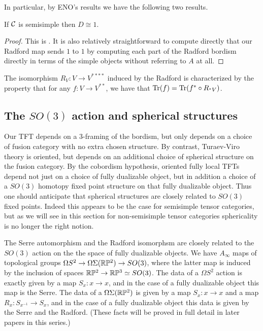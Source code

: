 \documentclass{amsart}
\begin{document}
In particular, by ENO's results we have the following two results.

\begin{lemma}
If $\mathcal C$ is semisimple then $D \cong 1$.
\end{lemma}
\begin{proof}
This is \cite[Cor 6.4]{MR2097289}.  It is also relatively straightforward to compute directly that our Radford map sends $1$ to $1$ by computing each part of the Radford bordism directly in terms of the simple objects without referring to $A$ at all.
\end{proof}


\begin{lemma} \cite[Cor. 7.4]{MR2097289} \label{lem:characterize-Radford}
The isomorphism $R_V:V \rightarrow V^{****}$ induced by the Radford is characterized by the property that for any $f: V \rightarrow V^{**}$, we have that $\mathrm{Tr}(f) = \mathrm{Tr}(f^* \circ R_{{}^*V})$. 
\end{lemma}


\subsection{The $SO(3)$ action and spherical structures}

Our TFT depends on a $3$-framing of the bordism, but only depends on a choice of fusion category with no extra chosen structure.  By contrast, Turaev-Viro theory is oriented, but depends on an additional choice of spherical structure on the fusion category.  By the cobordism hypothesis, oriented fully local TFTs depend not just on a choice of fully dualizable object, but in addition a choice of a $SO(3)$ homotopy fixed point structure on that fully dualizable object.  Thus one should anticipate that spherical structures are closely related to $SO(3)$ fixed points.  Indeed this appears to be the case for semisimple tensor categories, but as we will see in this section for non-semisimple tensor categories sphericality is no longer the right notion.

The Serre automorphism and the Radford isomorphsm are closely related to the $SO(3)$ action on the the space of fully dualizable objects.  We have $A_\infty$ maps of topological groups $\Omega S^2 \rightarrow \Omega \Sigma (\mathbb R \mathbb P^2) \rightarrow SO(3)$, where the latter map is induced by the inclusion of spaces $\mathbb R \mathbb P^2 \to \mathbb R \mathbb P^3 \simeq SO(3)$.  The data of a $\Omega S^2$ action is exactly given by a map $S_x: x \rightarrow x$, and in the case of a fully dualizable object this map is the Serre.  The data of a $\Omega \Sigma (\mathbb R \mathbb P^2)$ is given by a map $S_x: x \rightarrow x$ and a map $R_x: S_{x^{-1}} \rightarrow S_x$, and in the case of a fully dualizable object this data is given by the Serre and the Radford.  (These facts will be proved in full detail in later papers in this series.)
\end{document}

